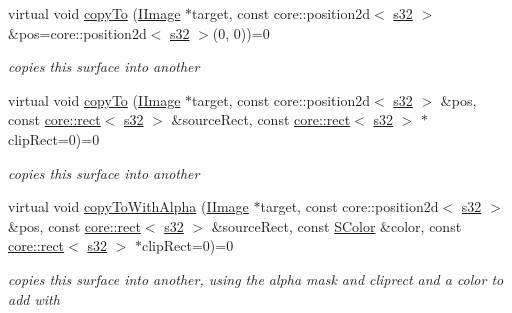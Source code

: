 \begin{DoxyCompactItemize}
\mbox{\label{classirr_1_1video_1_1IImage_ae4a8a2fc245f691224825aceffd53b8a}} 
virtual void \hyperlink{classirr_1_1video_1_1IImage_ae4a8a2fc245f691224825aceffd53b8a}{copy\+To} (\hyperlink{classirr_1_1video_1_1IImage}{I\+Image} $\ast$target, const core\+::position2d$<$ \hyperlink{namespaceirr_ac66849b7a6ed16e30ebede579f9b47c6}{s32} $>$ \&pos=core\+::position2d$<$ \hyperlink{namespaceirr_ac66849b7a6ed16e30ebede579f9b47c6}{s32} $>$(0, 0))=0
\begin{DoxyCompactList}\small\item\em copies this surface into another \end{DoxyCompactList}\item 
\mbox{\label{classirr_1_1video_1_1IImage_ac43f477f9da28077fc3573a628b33bcb}} 
virtual void \hyperlink{classirr_1_1video_1_1IImage_ac43f477f9da28077fc3573a628b33bcb}{copy\+To} (\hyperlink{classirr_1_1video_1_1IImage}{I\+Image} $\ast$target, const core\+::position2d$<$ \hyperlink{namespaceirr_ac66849b7a6ed16e30ebede579f9b47c6}{s32} $>$ \&pos, const \hyperlink{classirr_1_1core_1_1rect}{core\+::rect}$<$ \hyperlink{namespaceirr_ac66849b7a6ed16e30ebede579f9b47c6}{s32} $>$ \&source\+Rect, const \hyperlink{classirr_1_1core_1_1rect}{core\+::rect}$<$ \hyperlink{namespaceirr_ac66849b7a6ed16e30ebede579f9b47c6}{s32} $>$ $\ast$clip\+Rect=0)=0
\begin{DoxyCompactList}\small\item\em copies this surface into another \end{DoxyCompactList}\item 
\mbox{\label{classirr_1_1video_1_1IImage_a7dd1e5dd19cb35be17c2fa00e38a193d}} 
virtual void \hyperlink{classirr_1_1video_1_1IImage_a7dd1e5dd19cb35be17c2fa00e38a193d}{copy\+To\+With\+Alpha} (\hyperlink{classirr_1_1video_1_1IImage}{I\+Image} $\ast$target, const core\+::position2d$<$ \hyperlink{namespaceirr_ac66849b7a6ed16e30ebede579f9b47c6}{s32} $>$ \&pos, const \hyperlink{classirr_1_1core_1_1rect}{core\+::rect}$<$ \hyperlink{namespaceirr_ac66849b7a6ed16e30ebede579f9b47c6}{s32} $>$ \&source\+Rect, const \hyperlink{classirr_1_1video_1_1SColor}{S\+Color} \&color, const \hyperlink{classirr_1_1core_1_1rect}{core\+::rect}$<$ \hyperlink{namespaceirr_ac66849b7a6ed16e30ebede579f9b47c6}{s32} $>$ $\ast$clip\+Rect=0)=0
\begin{DoxyCompactList}\small\item\em copies this surface into another, using the alpha mask and cliprect and a color to add with \end{DoxyCompactList}\item 

\end{DoxyCompactItemize}
